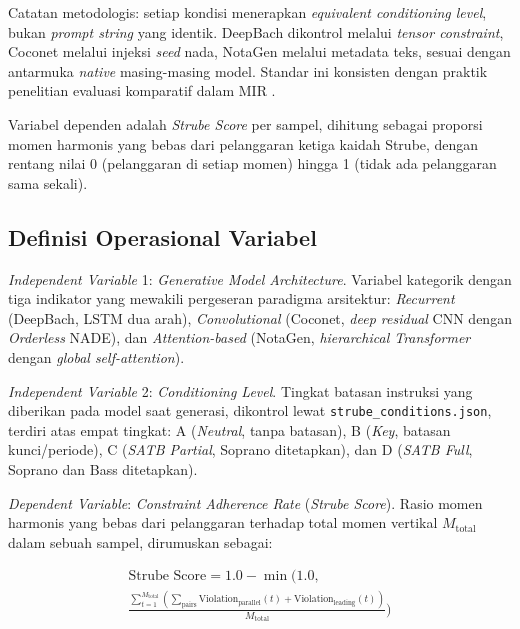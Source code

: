 Catatan metodologis: setiap kondisi menerapkan \textit{equivalent conditioning level}, bukan \textit{prompt string} yang identik. DeepBach dikontrol melalui \textit{tensor constraint}, Coconet melalui injeksi \textit{seed} nada, NotaGen melalui metadata teks, sesuai dengan antarmuka \textit{native} masing-masing model. Standar ini konsisten dengan praktik penelitian evaluasi komparatif dalam MIR \parencite{hadjeres2017, huang2017}.

Variabel dependen adalah \textit{Strube Score} per sampel, dihitung sebagai proporsi momen harmonis yang bebas dari pelanggaran ketiga kaidah Strube, dengan rentang nilai 0 (pelanggaran di setiap momen) hingga 1 (tidak ada pelanggaran sama sekali).

\subsection{Definisi Operasional Variabel}

\textit{Independent Variable} 1: \textit{Generative Model Architecture}. Variabel kategorik dengan tiga indikator yang mewakili pergeseran paradigma arsitektur: \textit{Recurrent} (DeepBach, LSTM dua arah), \textit{Convolutional} (Coconet, \textit{deep residual} CNN dengan \textit{Orderless} NADE), dan \textit{Attention-based} (NotaGen, \textit{hierarchical Transformer} dengan \textit{global self-attention}).

\textit{Independent Variable} 2: \textit{Conditioning Level}. Tingkat batasan instruksi yang diberikan pada model saat generasi, dikontrol lewat \texttt{strube\_conditions.json}, terdiri atas empat tingkat: A (\textit{Neutral}, tanpa batasan), B (\textit{Key}, batasan kunci/periode), C (\textit{SATB Partial}, Soprano ditetapkan), dan D (\textit{SATB Full}, Soprano dan Bass ditetapkan).

\textit{Dependent Variable}: \textit{Constraint Adherence Rate} (\textit{Strube Score}). Rasio momen harmonis yang bebas dari pelanggaran terhadap total momen vertikal $M_{\text{total}}$ dalam sebuah sampel, dirumuskan sebagai:

{\small
\begin{multline}
\text{Strube Score} = 1.0 - \min\Biggl(1.0,\; \\
\frac{\displaystyle\sum_{t=1}^{M_{\text{total}}} \left(\sum_{\text{pairs}} \text{Violation}_{\text{parallel}}(t) + \text{Violation}_{\text{leading}}(t)\right)}{M_{\text{total}}}\Biggr)
\end{multline}
}

